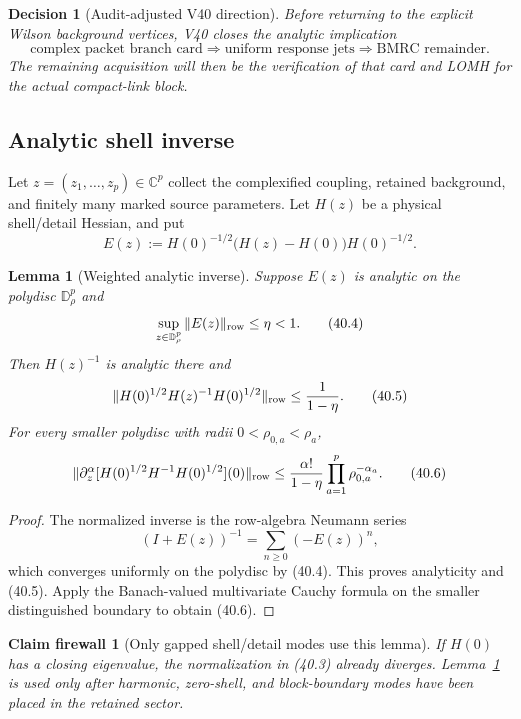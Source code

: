 \documentclass[11pt,oneside]{book}
\newtheorem{lemma}[theorem]{Lemma}
\newtheorem{firewall}[theorem]{Claim firewall}
\newtheorem{decision}[theorem]{Decision}
\theoremstyle{definition}
\theoremstyle{remark}
\begin{document}
\begin{decision}[Audit-adjusted V40 direction]
\label{dec:e8v40-direction}
Before returning to the explicit Wilson background vertices, V40
closes the analytic implication
\[
 \text{complex packet branch card}
 \Longrightarrow
 \text{uniform response jets}
 \Longrightarrow
 \text{BMRC remainder}.                                          \tag{40.2}
\]
The remaining acquisition will then be the verification of that card
and LOMH for the actual compact-link block.
\end{decision}

\subsection{Analytic shell inverse}

Let \(z=(z_1,\ldots,z_p)\in{\mathbb C}^p\) collect the complexified
coupling, retained background, and finitely many marked source
parameters.  Let \(H(z)\) be a physical shell/detail Hessian, and put
\[
 E(z):=
 H(0)^{-1/2}\bigl(H(z)-H(0)\bigr)H(0)^{-1/2}.                    \tag{40.3}
\]

\begin{lemma}[Weighted analytic inverse]
\label{lem:e8v40-analytic-inverse}
Suppose \(E(z)\) is analytic on the polydisc
\({\mathbb D}_\rho^p\) and
\[
 \sup_{z\in{\mathbb D}_\rho^p}
 \|E(z)\|_{\rm row}\leq\eta<1.                                  \tag{40.4}
\]
Then \(H(z)^{-1}\) is analytic there and
\[
 \|H(0)^{1/2}H(z)^{-1}H(0)^{1/2}\|_{\rm row}
 \leq\frac1{1-\eta}.                                             \tag{40.5}
\]
For every smaller polydisc with radii
\(0<\rho_{0,a}<\rho_a\),
\[
 \|\partial_z^\alpha
 [H(0)^{1/2}H^{-1}H(0)^{1/2}](0)\|_{\rm row}
 \leq
 \frac{\alpha!}{1-\eta}
 \prod_{a=1}^p\rho_{0,a}^{-\alpha_a}.                           \tag{40.6}
\]
\end{lemma}

\begin{proof}
The normalized inverse is the row-algebra Neumann series
\[
 (I+E(z))^{-1}=\sum_{n\geq0}(-E(z))^n,
\]
which converges uniformly on the polydisc by (40.4).  This proves
analyticity and (40.5).  Apply the Banach-valued multivariate Cauchy
formula on the smaller distinguished boundary to obtain (40.6).
\end{proof}

\begin{firewall}[Only gapped shell/detail modes use this lemma]
\label{fire:e8v40-gapped-only}
If \(H(0)\) has a closing eigenvalue, the normalization in (40.3)
already diverges.  Lemma~\ref{lem:e8v40-analytic-inverse} is used
only after harmonic, zero-shell, and block-boundary modes have been
placed in the retained sector.
\end{firewall}
\end{document}
